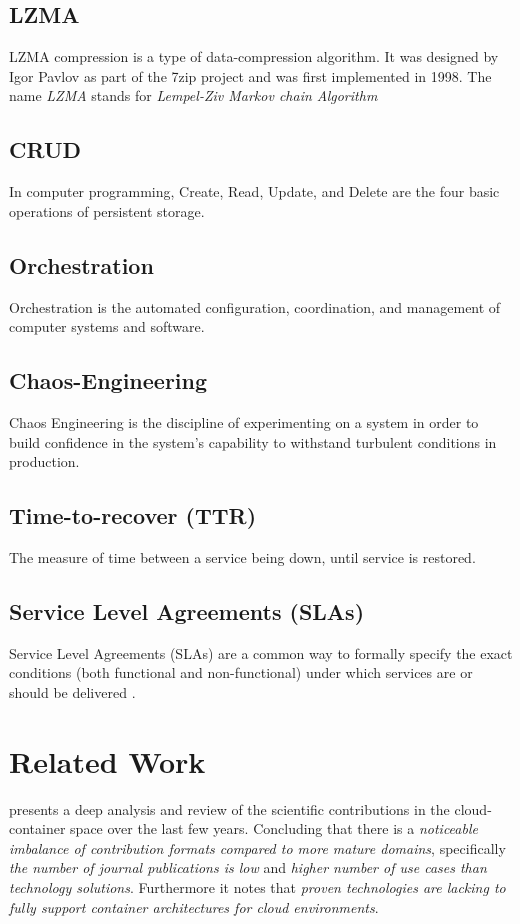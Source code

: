 \section*{LZMA}
LZMA compression is a type of data-compression algorithm.
It was designed by Igor Pavlov as part of the 7zip \cite{pavlov_2022} project and was first implemented in 1998.
The name \textit{LZMA} stands for \textit{Lempel-Ziv Markov chain Algorithm}\cite{winzip_2021}

\section*{CRUD}
In computer programming, Create, Read, Update, and Delete are the four basic operations of persistent storage\cite{martin1983managing}.

\section*{Orchestration}
Orchestration is the automated configuration, coordination, and management of computer systems and software\cite{erl1900service}.

\section*{Chaos-Engineering}
Chaos Engineering is the discipline of experimenting on a system in order to build confidence in the system's capability to withstand turbulent conditions in production\cite{hochstein_2019}.

\section*{Time-to-recover (TTR)}
The measure of time between a service being down, until service is restored.

\section*{Service Level Agreements (SLAs)}
Service Level Agreements (SLAs) are a common way to formally specify the exact
conditions (both functional and non-functional) under which services are or should
be delivered \cite{wieder2011service}.


\chapter{Related Work}

\cite{pahl2017cloud} presents a deep analysis and review of the scientific contributions in the cloud-container space over the last few years.
Concluding that there is a \emph{noticeable imbalance of contribution formats compared to more mature domains}, specifically 
\emph{the number of journal publications is low} and \emph{higher number of use cases than technology solutions}. 
Furthermore it notes that \emph{proven technologies are lacking to fully support container architectures for cloud environments}. \\

